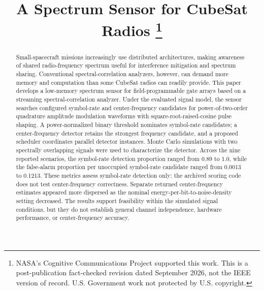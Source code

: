 \documentclass[conference]{IEEEtran}
\begin{document}
\title{A Spectrum Sensor for CubeSat Radios%
\thanks{NASA's Cognitive Communications Project supported this work. This is a post-publication fact-checked revision dated September 2026, not the IEEE version of record. U.S. Government work not protected by U.S. copyright.}}

\author{
}

\maketitle

\begin{abstract}
Small-spacecraft missions increasingly use distributed architectures, making awareness of shared radio-frequency spectrum useful for interference mitigation and spectrum sharing. Conventional spectral-correlation analyzers, however, can demand more memory and computation than some CubeSat radios can readily provide. This paper develops a low-memory spectrum sensor for field-programmable gate arrays based on a streaming spectral-correlation analyzer. Under the evaluated signal model, the sensor searches configured symbol-rate and center-frequency candidates for power-of-two-order quadrature amplitude modulation waveforms with square-root-raised-cosine pulse shaping. A power-normalized binary threshold nominates symbol-rate candidates; a center-frequency detector retains the strongest frequency candidate, and a proposed scheduler coordinates parallel detector instances. Monte Carlo simulations with two spectrally overlapping signals were used to characterize the detector. Across the nine reported scenarios, the symbol-rate detection proportion ranged from 0.89 to 1.0, while the false-alarm proportion per unoccupied symbol-rate candidate ranged from 0.0013 to 0.1213. These metrics assess symbol-rate detection only: the archived scoring code does not test center-frequency correctness. Separate returned center-frequency estimates appeared more dispersed as the nominal energy-per-bit-to-noise-density setting decreased. The results support feasibility within the simulated signal conditions, but they do not establish general channel independence, hardware performance, or center-frequency accuracy.
\end{abstract}
\end{document}
